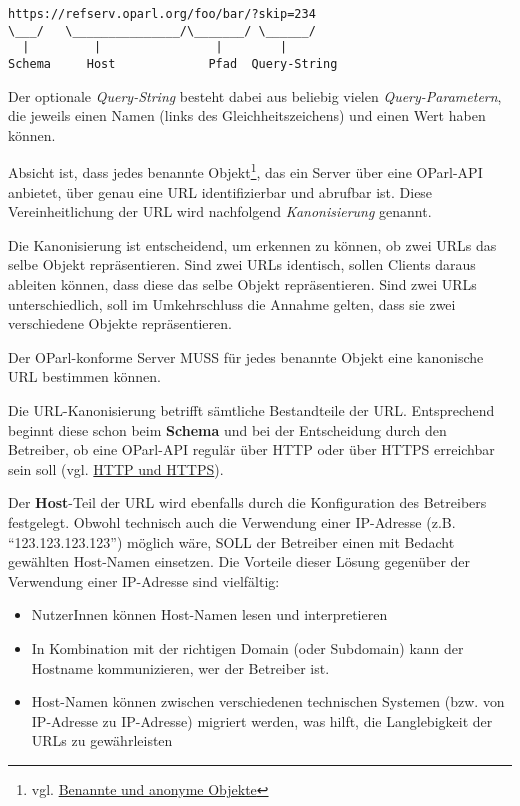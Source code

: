 \documentclass[,a4paper]{article}
\begin{document}
\begin{verbatim}
https://refserv.oparl.org/foo/bar/?skip=234
\___/   \_______________/\_______/ \______/
  |         |                |        |
Schema     Host             Pfad  Query-String
\end{verbatim}

Der optionale \emph{Query-String} besteht dabei aus beliebig vielen
\emph{Query-Parametern}, die jeweils einen Namen (links des
Gleichheitszeichens) und einen Wert haben können.


Absicht ist, dass jedes benannte Objekt\footnote{vgl.
  \hyperref[benannteux5fanonymeux5fobjekte]{Benannte und anonyme
  Objekte}}, das ein Server über eine OParl-API anbietet, über genau
eine URL identifizierbar und abrufbar ist. Diese Vereinheitlichung der
URL wird nachfolgend \emph{Kanonisierung} genannt.

Die Kanonisierung ist entscheidend, um erkennen zu können, ob zwei URLs
das selbe Objekt repräsentieren. Sind zwei URLs identisch, sollen
Clients daraus ableiten können, dass diese das selbe Objekt
repräsentieren. Sind zwei URLs unterschiedlich, soll im Umkehrschluss
die Annahme gelten, dass sie zwei verschiedene Objekte repräsentieren.

Der OParl-konforme Server MUSS für jedes benannte Objekt eine kanonische
URL bestimmen können.

Die URL-Kanonisierung betrifft sämtliche Bestandteile der URL.
Entsprechend beginnt diese schon beim \textbf{Schema} und bei der
Entscheidung durch den Betreiber, ob eine OParl-API regulär über HTTP
oder über HTTPS erreichbar sein soll (vgl.
\hyperref[http-und-https]{HTTP und HTTPS}).

Der \textbf{Host}-Teil der URL wird ebenfalls durch die Konfiguration
des Betreibers festgelegt. Obwohl technisch auch die Verwendung einer
IP-Adresse (z.B. ``123.123.123.123'') möglich wäre, SOLL der Betreiber
einen mit Bedacht gewählten Host-Namen einsetzen. Die Vorteile dieser
Lösung gegenüber der Verwendung einer IP-Adresse sind vielfältig:

\begin{itemize}
\itemsep1pt\parskip0pt
\item
  NutzerInnen können Host-Namen lesen und interpretieren
\item
  In Kombination mit der richtigen Domain (oder Subdomain) kann der
  Hostname kommunizieren, wer der Betreiber ist.
\item
  Host-Namen können zwischen verschiedenen technischen Systemen (bzw.
  von IP-Adresse zu IP-Adresse) migriert werden, was hilft, die
  Langlebigkeit der URLs zu gewährleisten
\end{itemize}
\end{document}
